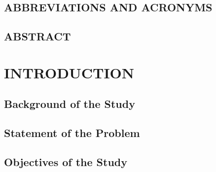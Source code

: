 \documentclass[12pt]{report}
\numberwithin{equation}{section}
\begin{document}
		
		\begin{onehalfspace}
			\pagebreak{} \tableofcontents{}
		\end{onehalfspace} \newpage
		\listoftables 
		\newpage
		\section*{\hspace{2cm}ABBREVIATIONS AND ACRONYMS}
		
	
		\pagebreak
		\section*{\hspace{5cm} ABSTRACT}
		
		 
		\newpage
		\chapter{INTRODUCTION}
		\section{Background of the Study}
	
		
		\section{Statement of the Problem}
	
		\section{Objectives of the Study}
\end{document}
